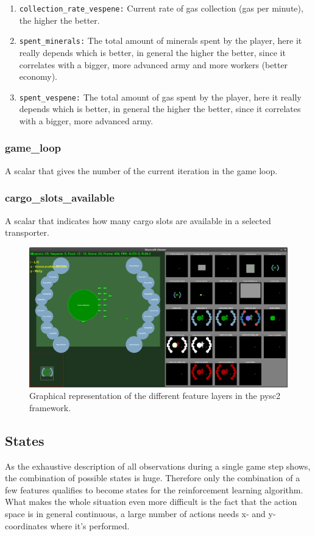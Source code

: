 \documentclass{article}
\begin{document}
\begin{enumerate}[noitemsep,start=0]
(minerals per minute), the higher the better.
\item \texttt{collection\_rate\_vespene:} Current rate of gas collection (gas 
per minute), the higher the better.
\item \texttt{spent\_minerals:} The total amount of minerals spent by the 
player, here it really depends which is better, in general the higher the 
better, since it correlates with a bigger, more advanced army and more workers 
(better economy).
\item \texttt{spent\_vespene:} The total amount of gas spent by the player, 
here it really depends which is better, in general the higher the better, since 
it correlates with a bigger, more advanced army.
\end{enumerate}


\subsubsection{game\_loop}
A scalar that gives the number of the current iteration in the game loop.


\subsubsection{cargo\_slots\_available}
A scalar that indicates how many cargo slots are available in a selected 
transporter.

\begin{figure}
\includegraphics[width=\textwidth]{state-actions-screenshot}
\caption{Graphical representation of the different feature layers in the pysc2 
framework.}
\label{screenshot}
\end{figure}


\subsection{States}
As the exhaustive description of all observations during a single game step 
shows, the combination of possible states is huge. Therefore only the 
combination of a few features qualifies to become states for the reinforcement 
learning algorithm. What makes the whole situation even more difficult is the 
fact that the action space is in general continuous, a large number of actions 
needs x- and y-coordinates where it's performed.
\end{document}
